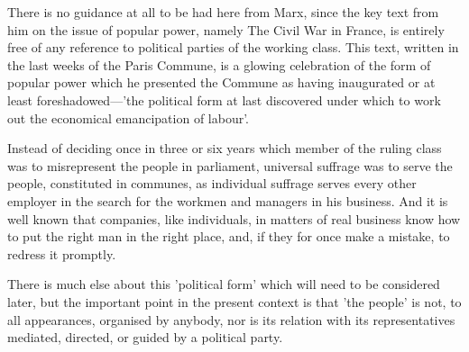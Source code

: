 There is no guidance at all to be had here from Marx, since the key text from him on the issue of popular power, namely The Civil War in France, is entirely free of any reference to political parties of the working class. This text, written in the last weeks of the Paris Commune, is a glowing celebration of the form of popular power which he presented the Commune as having inaugurated or at least foreshadowed—'the political form at last discovered under which to work out the economical emancipation of labour'.
\begin{displayquote}
    Instead of deciding once in three or six years which member of the ruling class was to misrepresent the people in parliament, universal suffrage was to serve the people, constituted in communes, as individual suffrage serves every other employer in the search for the workmen and managers in his business. And it is well known that companies, like individuals, in matters of real business know how to put the right man in the right place, and, if they for once make a mistake, to redress it promptly.
\end{displayquote}

There is much else about this 'political form' which will need to be considered later, but the important point in the present context is that 'the people' is not, to all appearances, organised by anybody, nor is its relation with its representatives mediated, directed, or guided by a political party.

